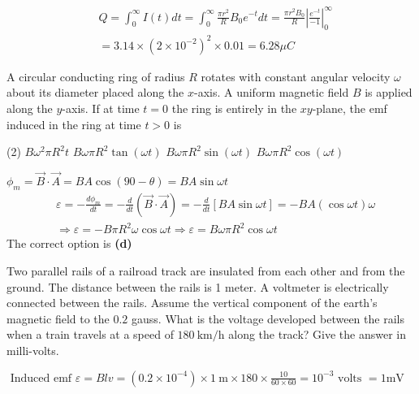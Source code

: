 \begin{enumerate}
\begin{answer}
$$\begin{aligned}
	&Q=\int_{0}^{\infty} I(t) d t=\int_{0}^{\infty} \frac{\pi r^{2}}{R} B_{0} e^{-t} d t=\frac{\pi r^{2} B_{0}}{R}\left|\frac{e^{-t}}{-1}\right|_{0}^{\infty} \\
	&=3.14 \times\left(2 \times 10^{-2}\right)^{2} \times 0.01=6.28 \mu C
	\end{aligned}$$	
\end{answer}
\begin{minipage}{\textwidth}
	\item A circular conducting ring of radius $R$ rotates with constant angular velocity $\omega$ about its diameter placed along the $x$-axis. A uniform magnetic field $B$ is applied along the $y$-axis. If at time $t=0$ the ring is entirely in the $x y$-plane, the emf induced in the ring at time $t>0$ is
\end{minipage}
\begin{tasks}(2)
	\task[\textbf{A.}] $B \omega^{2} \pi R^{2} t$
	\task[\textbf{B.}]$B \omega \pi R^{2} \tan (\omega t)$
	\task[\textbf{C.}]$B \omega \pi R^{2} \sin (\omega t)$
	\task[\textbf{D.}]$B \omega \pi R^{2} \cos (\omega t)$
\end{tasks}
\begin{answer}
	$\phi_{m}=\vec{B} \cdot \vec{A}=B A \cos (90-\theta)=B A \sin \omega t$\\
	\begin{align*}
		&\varepsilon=-\frac{d \phi_{m}}{d t}=-\frac{d}{d t}(\vec{B} \cdot \vec{A})=-\frac{d}{d t}[B A \sin \omega t]=-B A(\cos \omega t) \omega \\
		&\Rightarrow \varepsilon=-B \pi R^{2} \omega \cos \omega t \Rightarrow \varepsilon=B \omega \pi R^{2} \cos \omega t
	\end{align*}
	The correct option is \textbf{(d)}
\end{answer}
\begin{minipage}{\textwidth}
	\item Two parallel rails of a railroad track are insulated from each other and from the ground. The distance between the rails is 1 meter. A voltmeter is electrically connected between the rails. Assume the vertical component of the earth's magnetic field to the $0.2$ gauss. What is the voltage developed between the rails when a train travels at a speed of $180 \mathrm{~km} / \mathrm{h}$ along the track? Give the answer in milli-volts.
\end{minipage}
\begin{answer}
	$\text { Induced emf } \varepsilon=B l v=\left(0.2 \times 10^{-4}\right) \times 1 \mathrm{~m} \times 180 \times \frac{10}{60 \times 60}=10^{-3} \text { volts }=1 \mathrm{mV}$

\end{answer}
\end{enumerate}
